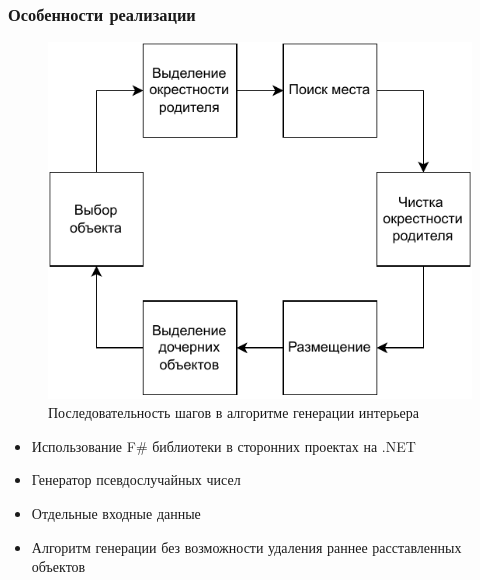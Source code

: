 \documentclass{beamer}
\begin{document}
\begin{frame}
  \frametitle{Особенности реализации}
  \begin{minipage}[m]{0.5\linewidth}
    \begin{figure}
      \centering
        \includegraphics[width=\textwidth]{pictures/pcg.pdf}
        \caption{Последовательность шагов в алгоритме генерации интерьера}
    \end{figure}
    \end{minipage}\hfill
    \begin{minipage}[m]{0.5\linewidth}
      \begin{itemize}
        \item Использование F\# библиотеки в сторонних проектах на .NET
        \item Генератор псевдослучайных чисел
        \item Отдельные входные данные
        \item Алгоритм генерации без возможности удаления раннее расставленных объектов
      \end{itemize}
    \end{minipage}
\end{frame}
\end{document}
